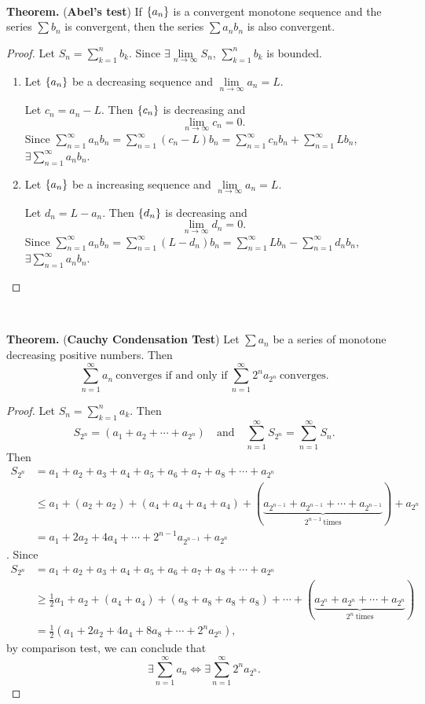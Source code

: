 \documentclass[12pt,a4paper]{article}
\newcommand{\dispsty}{\displaystyle}
\begin{document}
\
\begin{tcolorbox}[colback=white]
	\textbf{Theorem.} (\textbf{Abel's test}) If $\set{a_n}$ is a convergent monotone sequence and the series $\sum b_n$ is convergent, then the series $\sum a_nb_n$ is also convergent.\tcblower\begin{proof}
		Let $S_n=\dispsty\sum_{k=1}^nb_k$. Since $\exists\lim\limits_{n\to\infty}S_n$, $\sum_{k=1}^nb_k$ is bounded. \begin{enumerate}
			\item Let $\set{a_n}$ be a decreasing sequence and $\lim\limits_{n\to\infty}a_n=L$. \par
			Let $c_n=a_n-L$. Then $\set{c_n}$ is decreasing and \[
			\lim\limits_{n\to\infty}c_n=0.
			\] Since $\dispsty\sum_{n=1}^\infty a_nb_n=\sum_{n=1}^\infty(c_n-L)b_n=\sum_{n=1}^\infty c_nb_n+\sum_{n=1}^\infty Lb_n$, $\exists\sum_{n=1}^\infty a_nb_n$.
			\item  Let $\set{a_n}$ be a increasing sequence and $\lim\limits_{n\to\infty}a_n=L$. \par
			Let $d_n=L-a_n$. Then $\set{d_n}$ is decreasing and \[
			\lim\limits_{n\to\infty}d_n=0.
			\] Since $\dispsty\sum_{n=1}^\infty a_nb_n=\sum_{n=1}^\infty(L-d_n)b_n=\sum_{n=1}^\infty Lb_n-\sum_{n=1}^\infty d_nb_n$, $\exists\sum_{n=1}^\infty a_nb_n$.
		\end{enumerate}
	\end{proof}
\end{tcolorbox}
\
\begin{tcolorbox}[colback=white]
	\textbf{Theorem.} (\textbf{Cauchy Condensation Test}) Let $\sum a_n$ be a series of monotone decreasing positive numbers. Then \[
	\sum_{n=1}^\infty a_n\ \text{converges if and only if}\ \sum_{n=1}^\infty2^na_{2^n}\ \text{converges}.
	\]\tcblower\begin{proof}
		Let $\dispsty S_n=\sum_{k=1}^na_k$. Then \[
		S_{2^n}=(a_1+a_2+\cdots+a_{2^n})\quad\text{and}\quad\sum_{n=1}^\infty S_{2^n}=\sum_{n=1}^\infty S_n.
		\] Then \begin{align*}
		S_{2^n} &= a_1+a_2+a_3+a_4+a_5+a_6+a_7+a_8+\cdots+a_{2^n} \\
		&\leq a_1+(a_2+a_2)+(a_4+a_4+a_4+a_4)+(\underbrace{a_{2^{n-1}}+a_{2^{n-1}}+\cdots+a_{2^{n-1}}}_{2^{n-1}\ \text{times}})+a_{2^n} \\
		&=a_1+2a_2+4a_4+\cdots+2^{n-1}a_{2^{n-1}}+a_{2^n}
		\end{align*}. Since \begin{align*}
		S_{2^n} &= a_1+a_2+a_3+a_4+a_5+a_6+a_7+a_8+\cdots+a_{2^n} \\
		&\geq \frac{1}{2}a_1+a_2+(a_4+a_4)+(a_8+a_8+a_8+a_8)+\cdots+(\underbrace{a_{2^n}+a_{2^n}+\cdots+a_{2^n}}_{2^n\ \text{times}}) \\
		&=\frac{1}{2}(a_1+2a_2+4a_4+8a_8+\cdots+2^na_{2^n}),
		\end{align*} by comparison test, we can conclude that \[
		\exists\sum_{n=1}^\infty a_n\iff\exists\sum_{n=1}^\infty 2^na_{2^n}.
		\]
	\end{proof}
\end{tcolorbox}
\end{document}
